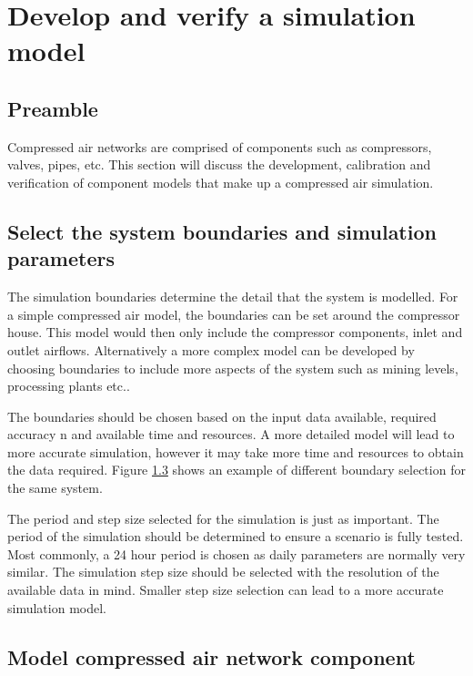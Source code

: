 \section{Develop and verify a simulation model}
	\subsection{Preamble}
	Compressed air networks are comprised of components such as compressors, valves, pipes, etc. This section will discuss the development, calibration and verification of component models that make up a compressed air simulation. 
	\subsection{Select the system boundaries and simulation parameters}
	The simulation boundaries determine the detail that the system is modelled. For a simple compressed air model, the boundaries can be set around the compressor house. This model would then only include the compressor components, inlet and outlet airflows. Alternatively a more complex model can be developed by choosing boundaries to include more aspects of the system such as mining levels, processing plants etc.. 
	\par 
	The boundaries should be chosen based on the input data available, required accuracy n and available time and resources. A more detailed model will lead to more accurate simulation, however it may take more time and resources to obtain the data required. Figure \ref{} shows an example of different boundary selection for the same system.
	\par
	The period and step size selected for the simulation is just as important. The period of the simulation should be determined to ensure a scenario is fully tested. Most commonly, a 24 hour period is chosen as daily parameters are normally very similar. The simulation step size should be selected with the resolution of the available data in mind. Smaller step size selection can lead to a more accurate simulation model. 
	\subsection{Model compressed air network component}
